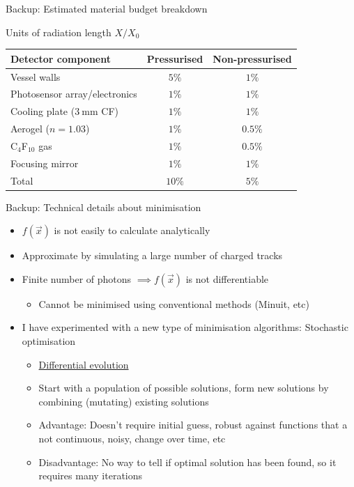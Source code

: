 \documentclass{beamer}
\begin{document}
\begin{frame}{Backup: Estimated material budget breakdown}
  \begin{center}
    Units of radiation length $X/X_0$
    \begin{tabular}{lcc}
        \hline
        Detector component                           & Pressurised & Non-pressurised \\
        \hline
        Vessel walls                                 & $5\%$                         & $1\%$ \\
        Photosensor array/electronics                & $1\%$                         & $1\%$ \\
        Cooling plate ($\SI{3}{\milli\meter}$ CF)    & $1\%$                         & $1\%$ \\
        Aerogel ($n = 1.03$)                         & $1\%$                         & $0.5\%$ \\
        C$_4$F$_{10}$ gas                              & $1\%$                         & $0.5\%$ \\
        Focusing mirror                              & $1\%$                         & $1\%$ \\
        \hline
        Total                                        & $10\%$                        & $5\%$ \\
        \hline
    \end{tabular}
  \end{center}
\end{frame}

\begin{frame}{Backup: Technical details about minimisation}
  \setlength\itemsep{1.0em}
  \begin{itemize}
    \item{$f(\vec{x})$ is not easily to calculate analytically}
    \item{Approximate by simulating a large number of charged tracks}
    \item{Finite number of photons $\implies f(\vec{x})$ is not differentiable}
    \begin{itemize}
      \item{Cannot be minimised using conventional methods (Minuit, etc)}
    \end{itemize}
    \item{I have experimented with a new type of minimisation algorithms: Stochastic optimisation}
    \begin{itemize}
      \item{\href{https://en.wikipedia.org/wiki/Differential_evolution}{Differential evolution}}
      \item{Start with a population of possible solutions, form new solutions by combining (mutating) existing solutions}
      \item{Advantage: Doesn't require initial guess, robust against functions that a not continuous, noisy, change over time, etc}
      \item{Disadvantage: No way to tell if optimal solution has been found, so it requires many iterations}
    \end{itemize}
  \end{itemize}
\end{frame}
\end{document}
